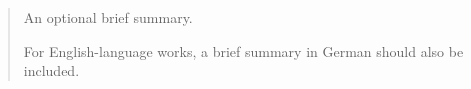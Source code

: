 %

\begin{abstract}
An optional brief summary.

For English-language works, a brief summary in German should also be included.
\end{abstract}
